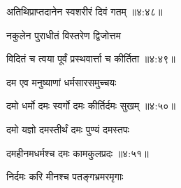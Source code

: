 
{\devanagarifont अतिथिप्राप्तदानेन स्वशरीरं दिवं गतम् {॥४:४८॥} \veg\dontdisplaylinenum }%

{\devanagarifont नकुलेन पुराधीतं विस्तरेण द्विजोत्तम \thinspace{\dandab} \dontdisplaylinenum }%


{\devanagarifont विदितं च त्वया पूर्वं प्रस्थवार्त्ता च कीर्तिता {॥४:४९॥} \veg\dontdisplaylinenum }%


{\devanagarifont दम एव मनुष्याणां धर्मसारसमुच्चयः \thinspace{\dandab} \dontdisplaylinenum }%


{\devanagarifont दमो धर्मो दमः स्वर्गो दमः कीर्तिर्दमः सुखम् {॥४:५०॥} \veg\dontdisplaylinenum }%

{\devanagarifont दमो यज्ञो दमस्तीर्थं दमः पुण्यं दमस्तपः \thinspace{\dandab} \dontdisplaylinenum }%


{\devanagarifont दमहीनमधर्मश्च दमः कामकुलप्रदः {॥४:५१॥} \veg\dontdisplaylinenum }%

{\devanagarifont निर्दमः करि मीनश्च पतङ्गभ्रमरमृगाः \thinspace{\dandab} \dontdisplaylinenum }%

